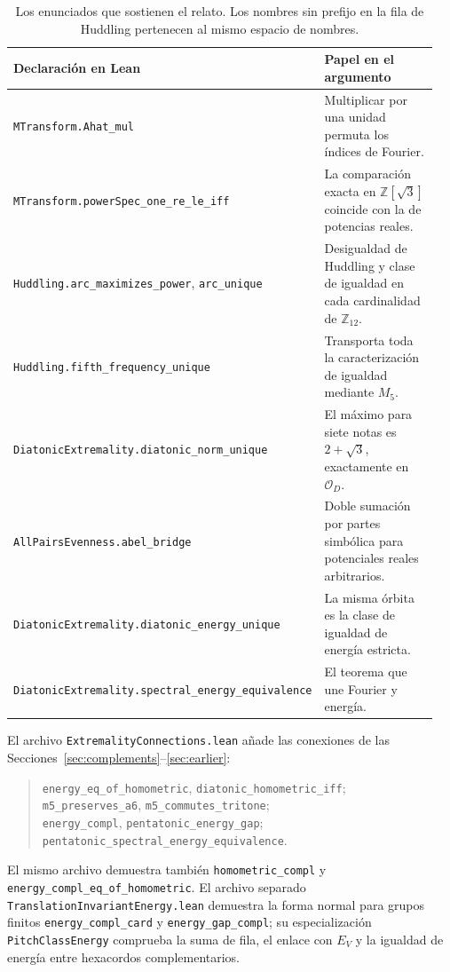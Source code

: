 \documentclass[11pt]{article}
\newcommand{\lean}[1]{\texttt{#1}}
\newcommand{\Ztwelve}{\mathbb{Z}_{12}}
\newcommand{\orb}{\mathcal O_D}
\begin{document}
\begin{table}[!htb]\centering
{}\footnotesize
\begin{tabular}{@{}p{0.47\linewidth}p{0.48\linewidth}@{}}\toprule
\rowcolor{ctA!22}
\textbf{Declaración en Lean} & \textbf{Papel en el argumento}\\\midrule
\lean{MTransform.Ahat\_mul} & Multiplicar por una unidad permuta los índices de Fourier.\\
\lean{MTransform.powerSpec\_one\_re\_le\_iff} & La comparación exacta en $\mathbb Z[\sqrt3]$ coincide con la de potencias reales.\\
\lean{Huddling.arc\_maximizes\_power}, \lean{arc\_unique} & Desigualdad de Huddling y clase de igualdad en cada cardinalidad de $\Ztwelve$.\\
\lean{Huddling.fifth\_frequency\_unique} & Transporta toda la caracterización de igualdad mediante $M_5$.\\
\lean{DiatonicExtremality.diatonic\_norm\_unique} & El máximo para siete notas es $2+\sqrt3$, exactamente en $\orb$.\\
\lean{AllPairsEvenness.abel\_bridge} & Doble sumación por partes simbólica para potenciales reales arbitrarios.\\
\lean{DiatonicExtremality.diatonic\_energy\_unique} & La misma órbita es la clase de igualdad de energía estricta.\\
\lean{DiatonicExtremality.}\newline\lean{spectral\_energy\_equivalence} & El teorema que une Fourier y energía.\\\bottomrule
\end{tabular}
\caption{Los enunciados que sostienen el relato. Los nombres sin prefijo en la fila
de Huddling pertenecen al mismo espacio de nombres.}
\label{tab:lean}
\end{table}

El archivo \lean{ExtremalityConnections.lean} añade las conexiones de las
Secciones~\ref{sec:complements}--\ref{sec:earlier}:
\begin{quote}\small
\lean{energy\_eq\_of\_homometric}, \lean{diatonic\_homometric\_iff};\\
\lean{m5\_preserves\_a6}, \lean{m5\_commutes\_tritone};\\
\lean{energy\_compl}, \lean{pentatonic\_energy\_gap};\\
\lean{pentatonic\_spectral\_energy\_equivalence}.
\end{quote}
El mismo archivo demuestra también \lean{homometric\_compl} y
\lean{energy\_compl\_eq\_of\_homometric}. El archivo separado
\lean{TranslationInvariantEnergy.lean} demuestra la forma normal para grupos finitos
\lean{energy\_compl\_card} y \lean{energy\_gap\_compl}; su especialización
\lean{PitchClassEnergy} comprueba la suma de fila, el enlace con $E_V$ y la igualdad
de energía entre hexacordos complementarios.
\end{document}
